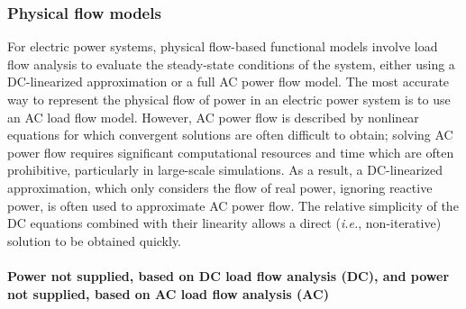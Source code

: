 
\subsubsection{Physical flow models}
\label{ssec:methods:models:physflow}

For electric power systems, physical flow-based functional models involve load flow analysis to evaluate the steady-state conditions of the system, either using a DC-linearized approximation or a full AC power flow model. The most accurate way to represent the physical flow of power in an electric power system is to use an AC load flow model. However, AC power flow is described by nonlinear equations for which convergent solutions are often difficult to obtain; solving AC power flow requires significant computational resources and time which are often prohibitive, particularly in large-scale simulations. As a result, a DC-linearized approximation, which only considers the flow of real power, ignoring reactive power, is often used to approximate AC power flow. The relative simplicity of the DC equations combined with their linearity allows a direct (\emph{i.e.}, non-iterative) solution to be obtained quickly.  

\paragraph{\normalfont\textbf{Power not supplied, based on DC load flow analysis (DC)}, and \textbf{power not supplied, based on AC load flow analysis (AC)
}}


